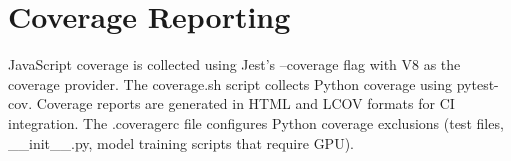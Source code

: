 \section{Coverage Reporting}
JavaScript coverage is collected using Jest's --coverage flag with V8 as the coverage provider. The coverage.sh script collects Python coverage using pytest-cov. Coverage reports are generated in HTML and LCOV formats for CI integration. The .coveragerc file configures Python coverage exclusions (test files, \_\allowbreak \allowbreak \_\allowbreak \allowbreak init\_\allowbreak \allowbreak \_\allowbreak \allowbreak .py, model training scripts that require GPU).

